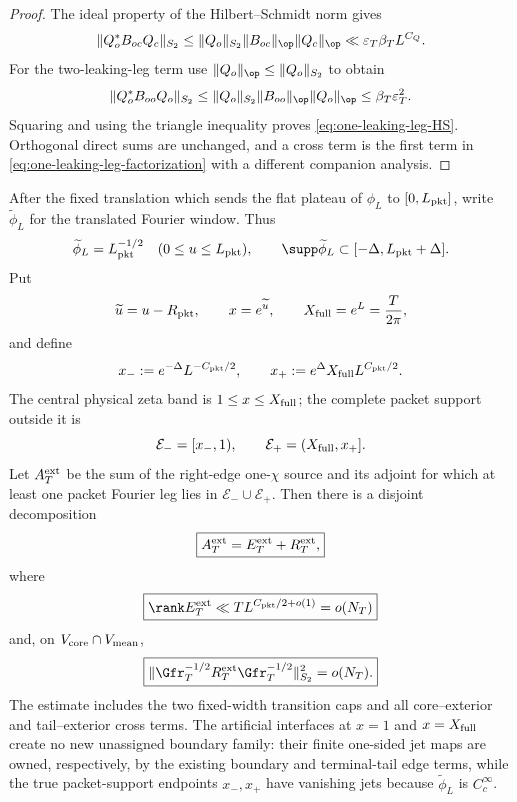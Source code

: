 \begin{proof}
The ideal property of the Hilbert--Schmidt norm gives
\[
\|Q_o^*B_{oc}Q_c\|_{S_2}
\le
\|Q_o\|_{S_2}\|B_{oc}\|_{\op}\|Q_c\|_{\op}
\ll \varepsilon_T\beta_TL^{C_Q}.
\]
For the two-leaking-leg term use
$\|Q_o\|_{\op}\le\|Q_o\|_{S_2}$ to obtain
\[
\|Q_o^*B_{oo}Q_o\|_{S_2}
\le
\|Q_o\|_{S_2}\|B_{oo}\|_{\op}\|Q_o\|_{\op}
\le \beta_T\varepsilon_T^2.
\]
Squaring and using the triangle inequality proves
\eqref{eq:one-leaking-leg-HS}. Orthogonal direct sums are unchanged, and a
cross term is the first term in
\eqref{eq:one-leaking-leg-factorization} with a different companion analysis.
\end{proof}

\begin{proposition}
\label{prop:exterior-packet-support}
After the fixed translation which sends the flat plateau of $\phi_L$ to
$[0,L_{\rm pkt}]$, write $\widetilde\phi_L$ for the translated Fourier window.
Thus
\[
\widetilde\phi_L=L_{\rm pkt}^{-1/2}
\quad(0\le u\le L_{\rm pkt}),
\qquad
\supp\widetilde\phi_L\subset[-\Delta,L_{\rm pkt}+\Delta].
\]
Put
\[
\widetilde u=u-R_{\rm pkt},
\qquad x=e^{\widetilde u},
\qquad X_{\rm full}=e^L=\frac{T}{2\pi},
\]
and define
\[
x_-:=e^{-\Delta}L^{-C_{\rm pkt}/2},
\qquad
x_+:=e^{\Delta}X_{\rm full}L^{C_{\rm pkt}/2}.
\]
The central physical zeta band is $1\le x\le X_{\rm full}$; the complete
packet support outside it is
\[
\mathcal E_-=[x_-,1),
\qquad
\mathcal E_+=(X_{\rm full},x_+].
\]
Let $A_T^{\rm ext}$ be the sum of the right-edge one-$\chi$ source and its
adjoint for which at least one packet Fourier leg lies in
$\mathcal E_-\cup\mathcal E_+$. Then there is a disjoint decomposition
\begin{equation}
\boxed{
A_T^{\rm ext}=E_T^{\rm ext}+R_T^{\rm ext},
}
\label{eq:exterior-packet-decomposition}
\end{equation}
where
\begin{equation}
\boxed{
\rank E_T^{\rm ext}
\ll T L^{C_{\rm pkt}/2+o(1)}=o(N_T)
}
\label{eq:exterior-packet-rank}
\end{equation}
and, on $V_{\rm core}\cap V_{\rm mean}$,
\begin{equation}
\boxed{
\|\Gfr_T^{-1/2}R_T^{\rm ext}\Gfr_T^{-1/2}\|_{S_2}^2=o(N_T).
}
\label{eq:exterior-packet-HS}
\end{equation}
The estimate includes the two fixed-width transition caps and all
core--exterior and tail--exterior cross terms. The artificial interfaces at
$x=1$ and $x=X_{\rm full}$ create no new unassigned boundary family: their
finite one-sided jet maps are owned, respectively, by the existing boundary
and terminal-tail edge terms, while the true packet-support endpoints
$x_-,x_+$ have vanishing jets because $\widetilde\phi_L$ is $C_c^\infty$.
\end{proposition}

